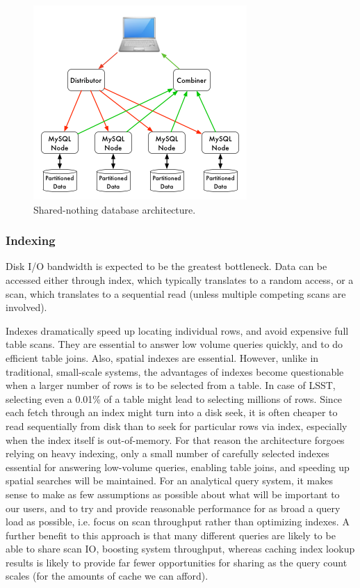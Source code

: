 \documentclass[DM,lsstdraft,toc]{lsstdoc}
\begin{document}
\begin{figure}[H]
\centering
\includegraphics{_static/shared_nothing_arch.png}
\caption{Shared-nothing database architecture.}
\end{figure}

\subsubsection{Indexing}\label{indexing}

Disk I/O bandwidth is expected to be the greatest bottleneck. Data can
be accessed either through index, which typically translates to a random
access, or a scan, which translates to a sequential read (unless
multiple competing scans are involved).

Indexes dramatically speed up locating individual rows, and avoid
expensive full table scans. They are essential to answer low volume
queries quickly, and to do efficient table joins. Also, spatial indexes
are essential. However, unlike in traditional, small-scale systems, the
advantages of indexes become questionable when a larger number of rows
is to be selected from a table. In case of LSST, selecting even a 0.01\%
of a table might lead to selecting millions of rows. Since each fetch
through an index might turn into a disk seek, it is often cheaper to
read sequentially from disk than to seek for particular rows via index,
especially when the index itself is out-of-memory. For that reason the
architecture forgoes relying on heavy indexing, only a small number of
carefully selected indexes essential for answering low-volume queries,
enabling table joins, and speeding up spatial searches will be
maintained. For an analytical query system, it makes sense to make as
few assumptions as possible about what will be important to our users,
and to try and provide reasonable performance for as broad a query load
as possible, i.e. focus on scan throughput rather than optimizing
indexes. A further benefit to this approach is that many different
queries are likely to be able to share scan IO, boosting system
throughput, whereas caching index lookup results is likely to provide
far fewer opportunities for sharing as the query count scales (for the
amounts of cache we can afford).
\end{document}
